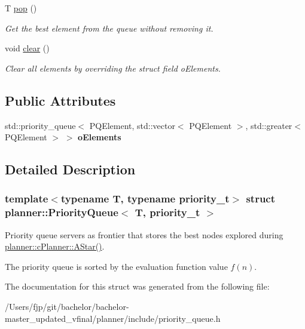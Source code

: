 \begin{DoxyCompactItemize}
T \mbox{\hyperlink{structplanner_1_1_priority_queue_abba3d8fcc5729acc424b1fbc38c94e84}{pop}} ()
\begin{DoxyCompactList}\small\item\em Get the best element from the queue without removing it. \end{DoxyCompactList}\item 
\mbox{\label{structplanner_1_1_priority_queue_aa98bde3a7a3256915f80e1e61572214b}} 
void \mbox{\hyperlink{structplanner_1_1_priority_queue_aa98bde3a7a3256915f80e1e61572214b}{clear}} ()
\begin{DoxyCompactList}\small\item\em Clear all elements by overriding the struct field o\+Elements. \end{DoxyCompactList}\end{DoxyCompactItemize}
\subsection*{Public Attributes}
\begin{DoxyCompactItemize}
\item 
\mbox{\label{structplanner_1_1_priority_queue_a17b97e9a14688c54abec4de74b4b790f}} 
std\+::priority\+\_\+queue$<$ P\+Q\+Element, std\+::vector$<$ P\+Q\+Element $>$, std\+::greater$<$ P\+Q\+Element $>$ $>$ {\bfseries o\+Elements}
\end{DoxyCompactItemize}


\subsection{Detailed Description}
\subsubsection*{template$<$typename T, typename priority\+\_\+t$>$\newline
struct planner\+::\+Priority\+Queue$<$ T, priority\+\_\+t $>$}

Priority queue servers as frontier that stores the best nodes explored during \mbox{\hyperlink{classplanner_1_1c_planner_a341e70531266f023ac9461d18979d1ef}{planner\+::c\+Planner\+::\+A\+Star()}}. 

The priority queue is sorted by the evaluation function value $f(n)$. 

The documentation for this struct was generated from the following file\+:\begin{DoxyCompactItemize}
\item 
/\+Users/fjp/git/bachelor/bachelor-\/master\+\_\+updated\+\_\+vfinal/planner/include/priority\+\_\+queue.\+h\end{DoxyCompactItemize}
